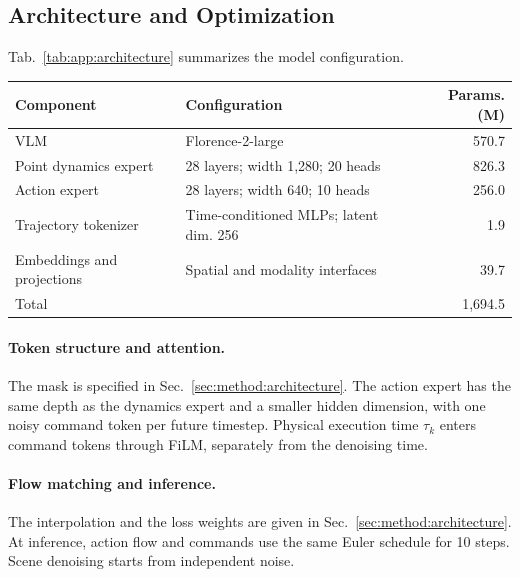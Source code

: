 \noindent\begin{minipage}{\linewidth}
\subsection{Architecture and Optimization}
\label{app:implementation}

Tab.~\ref{tab:app:architecture} summarizes the model configuration.

\begin{center}
    \makeatletter{}\makeatother
    \centering
    \small
    \setlength{\tabcolsep}{6pt}
    \renewcommand{\arraystretch}{1.12}
    \caption{Model architecture. Parameter counts include the frozen tokenizer.}
    \label{tab:app:architecture}
    \begin{tabular}{@{}llr@{}}
        \toprule
        Component & Configuration & Params. (M) \\
        \midrule
        VLM & Florence-2-large & 570.7 \\
        Point dynamics expert & 28 layers; width 1,280; 20 heads & 826.3 \\
        Action expert & 28 layers; width 640; 10 heads & 256.0 \\
        Trajectory tokenizer & Time-conditioned MLPs; latent dim. 256 & 1.9 \\
        Embeddings and projections & Spatial and modality interfaces & 39.7 \\
        \midrule
        Total & & 1,694.5 \\
        \bottomrule
    \end{tabular}
\end{center}
\end{minipage}

\paragraph{Token structure and attention.}
The mask is specified in Sec.~\ref{sec:method:architecture}.
The action expert has the same depth as the dynamics expert and a smaller
hidden dimension, with one noisy command token per future timestep.
Physical execution time $\tau_k$ enters command tokens through FiLM,
separately from the denoising time.

\paragraph{Flow matching and inference.}
The interpolation and the loss weights are given in
Sec.~\ref{sec:method:architecture}.
At inference, action flow and commands use the same Euler schedule for
10 steps. Scene denoising starts from independent noise.

